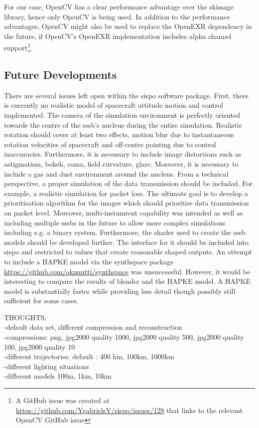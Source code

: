 For our case, OpenCV has a clear performance advantage over the \gls{skimage} library, hence only OpenCV is being used. In addition to the performance advantages, OpenCV might also be used to replace the OpenEXR dependency in the future, if OpenCV's OpenEXR implementation includes alpha channel support\footnote{A GitHub issue was created at \url{https://github.com/YgabrielsY/sispo/issues/128} that links to the relevant OpenCV GitHub issue}.

\subsection{Future Developments}
There are several issues left open within the \gls{sispo} software package. First, there is currently no realistic model of spacecraft attitude motion and control implemented. The camera of the simulation environment is perfectly oriented towards the centre of the \gls{sssb}'s nucleus during the entire simulation. Realistic rotation should cover at least two effects, motion blur due to instantaneous rotation velocities of spacecraft and off-centre pointing due to control inaccuracies. Furthermore, it is necessary to include  image distortions such as astigmatism, bokeh, coma, field curvature, glare. Moreover, it is necessary to include a gas and dust environment around the nucleus. From a technical perspective, a proper simulation of the data transmission should be included. For example, a realistic simulation for packet loss. The ultimate goal is to develop a prioritisation algorithm for the images which should prioritise data transmission on packet level.
Moreover, multi-instumrent capability was intended as well as including multiple \gls{sssb}s in the future to allow more complex simulations including e.g. a binary system.
Furthermore, the shader used to create the \gls{sssb} models should be developed further. The interface for it should be included into \gls{sispo} and restricted to values that create reasonable shaped outputs.
An attempt to include a HAPKE model via the synthspace package \url{https://github.com/oknuutti/synthspace} was unsuccessful. However, it would be interesting to compare the results of blender and the HAPKE model. A HAPKE model is substantially faster while providing less detail though possibly still sufficient for some cases.

THOUGHTS:\\
-default data set, different compression and reconstruction\\
    -compressions: png, jpg2000 quality 1000, jpg2000 quality 500, jpg2000 quality 100, jpg2000 quality 10\\
-different trajectories: default : 400 km, 100km, 1000km\\
-different lighting situations\\
-different models 100m, 1km, 10km